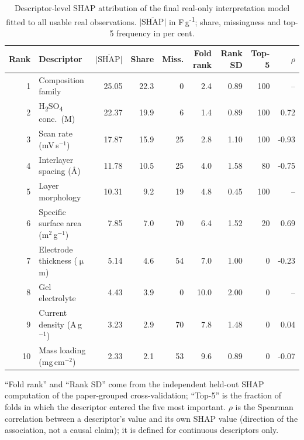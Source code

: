 \begin{table}[htbp]
\centering
\caption{Descriptor-level SHAP attribution of the final real-only interpretation model fitted to all usable real observations. $\overline{|\mathrm{SHAP}|}$ in F\,g\textsuperscript{-1}; share, missingness and top-5 frequency in per cent.}
\label{tab:shap}
\footnotesize
\begin{tabular}{rlrrrrrrr}
\toprule
\textbf{Rank} & \textbf{Descriptor} & \textbf{$\overline{|\mathrm{SHAP}|}$} & \textbf{Share} & \textbf{Miss.} & \textbf{Fold rank} & \textbf{Rank SD} & \textbf{Top-5} & \textbf{$\rho$} \\
\midrule
1 & Composition family & 25.05 & 22.3 & 0 & 2.4 & 0.89 & 100 & -- \\
2 & H\textsubscript{2}SO\textsubscript{4} conc.\ (M) & 22.37 & 19.9 & 6 & 1.4 & 0.89 & 100 & 0.72 \\
3 & Scan rate (mV\,s$^{-1}$) & 17.87 & 15.9 & 25 & 2.8 & 1.10 & 100 & -0.93 \\
4 & Interlayer spacing (\AA) & 11.78 & 10.5 & 25 & 4.0 & 1.58 & 80 & -0.75 \\
5 & Layer morphology & 10.31 & 9.2 & 19 & 4.8 & 0.45 & 100 & -- \\
6 & Specific surface area (m$^2$\,g$^{-1}$) & 7.85 & 7.0 & 70 & 6.4 & 1.52 & 20 & 0.69 \\
7 & Electrode thickness ($\upmu$m) & 5.14 & 4.6 & 54 & 7.0 & 1.00 & 0 & -0.23 \\
8 & Gel electrolyte & 4.43 & 3.9 & 0 & 10.0 & 2.00 & 0 & -- \\
9 & Current density (A\,g$^{-1}$) & 3.23 & 2.9 & 70 & 7.8 & 1.48 & 0 & 0.04 \\
10 & Mass loading (mg\,cm$^{-2}$) & 2.33 & 2.1 & 53 & 9.6 & 0.89 & 0 & -0.07 \\
\bottomrule
\end{tabular}
\par\vspace{2pt}\begin{minipage}{\linewidth}\scriptsize ``Fold rank'' and ``Rank SD'' come from the independent held-out SHAP computation of the paper-grouped cross-validation; ``Top-5'' is the fraction of folds in which the descriptor entered the five most important. $\rho$ is the Spearman correlation between a descriptor's value and its own SHAP value (direction of the association, not a causal claim); it is defined for continuous descriptors only.\end{minipage}
\end{table}